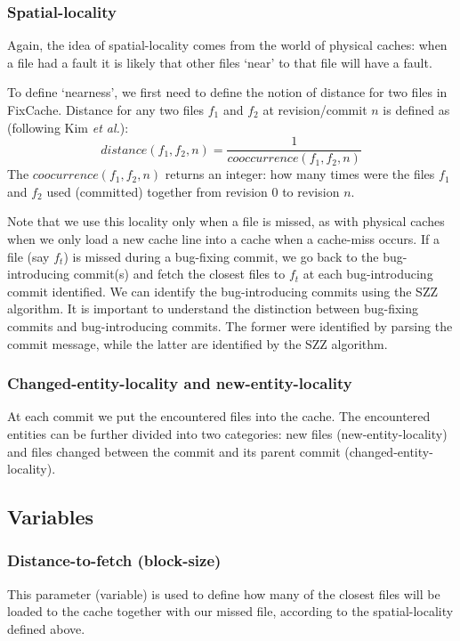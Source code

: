 \documentclass[12pt,twoside,notitlepage]{report}
\newcommand{\fxch}{FixCache}
\newcommand{\etal}{\textit{et al.}}
\begin{document}
\subsubsection{Spatial-locality}
Again, the idea of spatial-locality comes from the world of physical caches: when a file had a fault it is likely that other files `near' to that file will have a fault.

To define `nearness', we first need to define the notion of distance for two files in \fxch{}. Distance  for any two files $f_1$ and $f_2$ at revision/commit $n$ is defined as (following Kim \etal{}\cite{FixCache}):
\[
	distance(f_1, f_2, n) = \frac{1}{cooccurrence(f_1, f_2, n)}
\]
The $coocurrence(f_1, f_2, n)$ returns an integer: how many times were the files $f_1$ and $f_2$ used (committed) together from revision $0$ to revision $n$.

Note that we use this locality only when a file is missed, as with physical caches when we only load a new cache line into a cache when a cache-miss occurs. If a file (say $f_t$) is missed during a bug-fixing commit, we go back to the bug-introducing commit(s) and fetch the closest files to $f_t$ at each bug-introducing commit identified. We can identify the bug-introducing commits using the SZZ algorithm\cite{SZZ}. It is important to understand the distinction between bug-fixing commits and bug-introducing commits. The former were identified by parsing the commit message, while the latter are identified by the SZZ algorithm.

\subsubsection{Changed-entity-locality and new-entity-locality}
At each commit we put the encountered files into the cache. The encountered entities can be further divided into two categories: new files (new-entity-locality) and files changed between the commit and its parent commit (changed-entity-locality).
\subsection{Variables}\label{variables}
\subsubsection{Distance-to-fetch (block-size)}
This parameter (variable) is used to define how many of the closest files will be loaded to the cache together with our missed file, according to the spatial-locality defined above.
\end{document}
